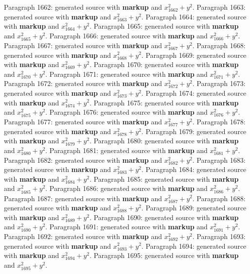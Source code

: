 \documentclass{article}
\begin{document}
Paragraph 1662: generated source with \textbf{markup} and $x_{1662}^2 + y^2$.
Paragraph 1663: generated source with \textbf{markup} and $x_{1663}^2 + y^2$.
Paragraph 1664: generated source with \textbf{markup} and $x_{1664}^2 + y^2$.
Paragraph 1665: generated source with \textbf{markup} and $x_{1665}^2 + y^2$.
Paragraph 1666: generated source with \textbf{markup} and $x_{1666}^2 + y^2$.
Paragraph 1667: generated source with \textbf{markup} and $x_{1667}^2 + y^2$.
Paragraph 1668: generated source with \textbf{markup} and $x_{1668}^2 + y^2$.
Paragraph 1669: generated source with \textbf{markup} and $x_{1669}^2 + y^2$.
Paragraph 1670: generated source with \textbf{markup} and $x_{1670}^2 + y^2$.
Paragraph 1671: generated source with \textbf{markup} and $x_{1671}^2 + y^2$.
Paragraph 1672: generated source with \textbf{markup} and $x_{1672}^2 + y^2$.
Paragraph 1673: generated source with \textbf{markup} and $x_{1673}^2 + y^2$.
Paragraph 1674: generated source with \textbf{markup} and $x_{1674}^2 + y^2$.
Paragraph 1675: generated source with \textbf{markup} and $x_{1675}^2 + y^2$.
Paragraph 1676: generated source with \textbf{markup} and $x_{1676}^2 + y^2$.
Paragraph 1677: generated source with \textbf{markup} and $x_{1677}^2 + y^2$.
Paragraph 1678: generated source with \textbf{markup} and $x_{1678}^2 + y^2$.
Paragraph 1679: generated source with \textbf{markup} and $x_{1679}^2 + y^2$.
Paragraph 1680: generated source with \textbf{markup} and $x_{1680}^2 + y^2$.
Paragraph 1681: generated source with \textbf{markup} and $x_{1681}^2 + y^2$.
Paragraph 1682: generated source with \textbf{markup} and $x_{1682}^2 + y^2$.
Paragraph 1683: generated source with \textbf{markup} and $x_{1683}^2 + y^2$.
Paragraph 1684: generated source with \textbf{markup} and $x_{1684}^2 + y^2$.
Paragraph 1685: generated source with \textbf{markup} and $x_{1685}^2 + y^2$.
Paragraph 1686: generated source with \textbf{markup} and $x_{1686}^2 + y^2$.
Paragraph 1687: generated source with \textbf{markup} and $x_{1687}^2 + y^2$.
Paragraph 1688: generated source with \textbf{markup} and $x_{1688}^2 + y^2$.
Paragraph 1689: generated source with \textbf{markup} and $x_{1689}^2 + y^2$.
Paragraph 1690: generated source with \textbf{markup} and $x_{1690}^2 + y^2$.
Paragraph 1691: generated source with \textbf{markup} and $x_{1691}^2 + y^2$.
Paragraph 1692: generated source with \textbf{markup} and $x_{1692}^2 + y^2$.
Paragraph 1693: generated source with \textbf{markup} and $x_{1693}^2 + y^2$.
Paragraph 1694: generated source with \textbf{markup} and $x_{1694}^2 + y^2$.
Paragraph 1695: generated source with \textbf{markup} and $x_{1695}^2 + y^2$.
\end{document}
